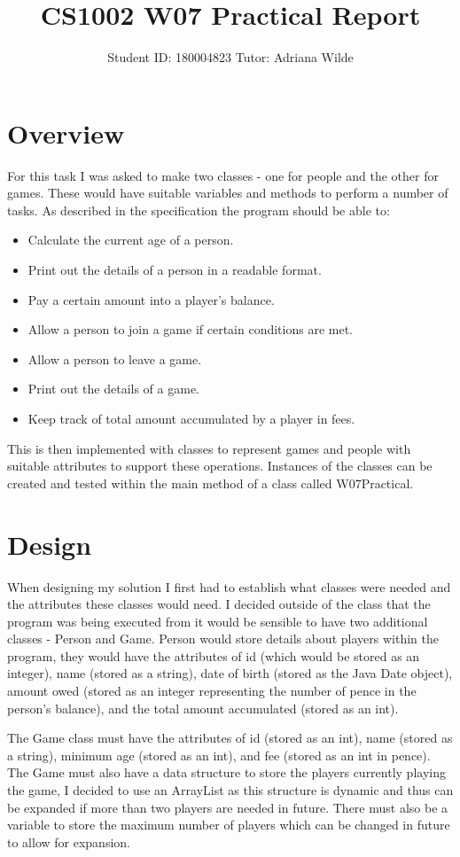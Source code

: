 \documentclass[a4paper]{article}
\title{CS1002 W07 Practical Report}
\author{Student ID: 180004823 Tutor: Adriana Wilde}
\begin{document}
\maketitle

\section*{Overview}

For this task I was asked to make two classes - one for people and the other for games.  These would have suitable variables and methods to perform a number of tasks. As described in the specification the program should be able to:
\begin{itemize}
\item Calculate the current age of a person.
\item Print out the details of a person in a readable format.
\item Pay a certain amount into a player's balance.
\item Allow a person to join a game if certain conditions are met.
\item Allow a person to leave a game.
\item Print out the details of a game.
\item Keep track of total amount accumulated by a player in fees.
\end{itemize}
This is then implemented with classes to represent games and people with suitable attributes to support these operations. Instances of the classes can be created and tested within the main method of a class called W07Practical.

\section*{Design}

When designing my solution I first had to establish what classes were needed and the attributes these classes would need. I decided outside of the class that the program was being executed from it would be sensible to have two additional classes - Person and Game. Person would store details about players within the program, they would have the attributes of id (which would be stored as an integer), name (stored as a string), date of birth (stored as the Java Date object), amount owed (stored as an integer representing the number of pence in the person's balance), and the total amount accumulated (stored as an int).

The Game class must have the attributes of id (stored as an int), name (stored as a string), minimum age (stored as an int), and fee (stored as an int in pence). The Game must also have a data structure to store the players currently playing the game, I decided to use an ArrayList as this structure is dynamic and thus can be expanded if more than two players are needed in future.  There must also be a variable to store the maximum number of players which can be changed in future to allow for expansion.
\end{document}
